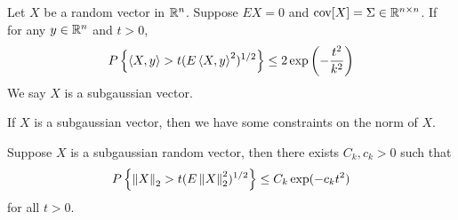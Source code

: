 \documentclass[a4paper]{article}
\begin{document}
\begin{defi}
  Let $X$ be a random vector in $\mathbb{R}^n$. Suppose $EX = 0$
  and $\operatorname{cov} [X] = \Sigma \in \mathbb{R}^{n \times n}$. If
  for any $y \in \mathbb{R}^n$ and $t > 0$,
  \[
    P \left\{ \left\langle X, y \right\rangle > t ( E \left\langle X, y \right\rangle^2 )^{1/2}
    \right\} \leq 2 \exp \left( - \frac{t^2}{k^2} \right)
  \]
  We say $X$ is a subgaussian vector.
\end{defi}

If $X$ is a subgaussian vector, then we have some constraints on
the norm of $X$.

\begin{thm}
  Suppose $X$ is a subgaussian random vector, then there exists
  $C_k, c_k > 0$ such that
  \[
    P \left\{ \left\lVert X\right\rVert_2 > t ( E \left\lVert X\right\rVert_2^2 )^{1/2} \right\}
    \leq C_k \exp (- c_k t^2)
  \]
  for all $t > 0$.
\end{thm}
\end{document}
